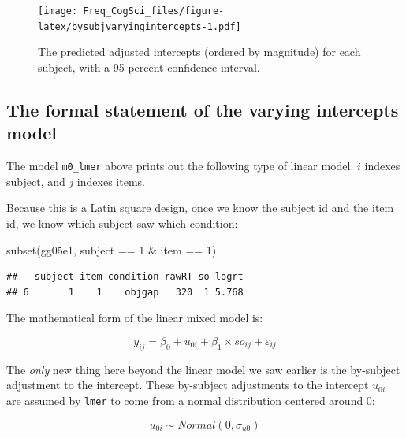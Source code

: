 \documentclass[
  12pt,
]{krantz}
\newenvironment{Shaded}{\begin{snugshade}}{\end{snugshade}}
\newcommand{\DecValTok}[1]{\textcolor[rgb]{0.00,0.00,0.81}{#1}}
\newcommand{\FunctionTok}[1]{\textcolor[rgb]{0.00,0.00,0.00}{#1}}
\newcommand{\NormalTok}[1]{#1}
\newcommand{\SpecialCharTok}[1]{\textcolor[rgb]{0.00,0.00,0.00}{#1}}
\theoremstyle{definition}
\theoremstyle{definition}
\theoremstyle{definition}
\theoremstyle{definition}
\theoremstyle{remark}
\begin{document}
\begin{figure}
\centering
\texttt{[image: Freq\_CogSci\_files/figure-latex/bysubjvaryingintercepts-1.pdf]}
\caption{\label{fig:bysubjvaryingintercepts}The predicted adjusted intercepts (ordered by magnitude) for each subject, with a 95 percent confidence interval.}
\end{figure}

\hypertarget{the-formal-statement-of-the-varying-intercepts-model}{%
\subsection{The formal statement of the varying intercepts model}\label{the-formal-statement-of-the-varying-intercepts-model}}

The model \texttt{m0\_lmer} above prints out the following type of linear model. \(i\) indexes subject, and \(j\) indexes items.

Because this is a Latin square design, once we know the subject id and the item id, we know which subject saw which condition:

\begin{Shaded}
\begin{Highlighting}[]
\FunctionTok{subset}\NormalTok{(gg05e1, subject }\SpecialCharTok{==} \DecValTok{1} \SpecialCharTok{\&}\NormalTok{ item }\SpecialCharTok{==} \DecValTok{1}\NormalTok{)}
\end{Highlighting}
\end{Shaded}

\begin{verbatim}
##   subject item condition rawRT so logrt
## 6       1    1    objgap   320  1 5.768
\end{verbatim}

The mathematical form of the linear mixed model is:

\begin{equation}
y_{ij} = \beta_0 + u_{0i}+\beta_1\times so_{ij} + \varepsilon_{ij}
\end{equation}

The \emph{only} new thing here beyond the linear model we saw earlier is the by-subject adjustment to the intercept. These by-subject adjustments to the intercept \(u_{0i}\) are assumed by \texttt{lmer} to come from a normal distribution centered around 0:

\begin{equation}
u_{0i} \sim Normal(0,\sigma_{u0})
\end{equation}
\end{document}
